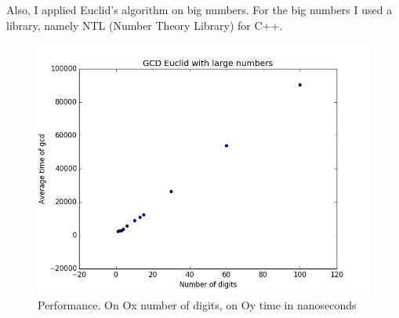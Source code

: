 \documentclass{article}
\begin{document}
Also, I applied Euclid's algorithm on big numbers.
For the big numbers I used a library, namely NTL (Number Theory Library) for C++.

\begin{figure}[H]
\caption{Performance. On Ox number of digits, on Oy time in nanoseconds}
\centering
\includegraphics{GCDEuclidManyBigger}
\end{figure}
\end{document}
